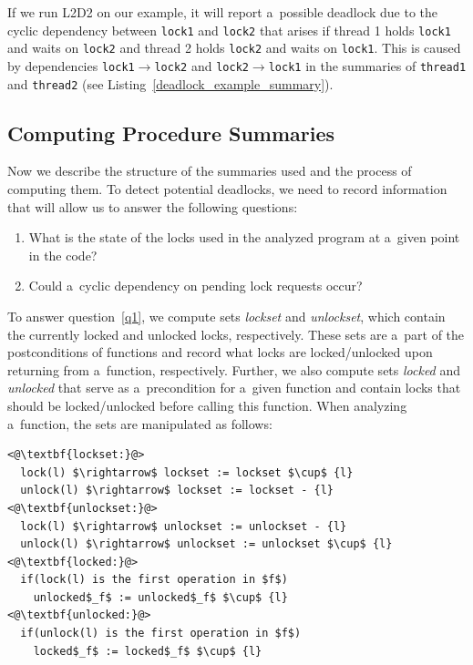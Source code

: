 \documentclass{ExcelAtFIT}
\begin{document}
If we run L2D2 on our example, it will report a~possible deadlock due to the cyclic dependency between \texttt{lock1} and \texttt{lock2} that arises if thread 1 holds \texttt{lock1} and waits on \texttt{lock2} and thread 2 holds \texttt{lock2} and waits on \texttt{lock1}. This is caused by dependencies \texttt{lock1$\rightarrow$lock2} and \texttt{lock2$\rightarrow$lock1} in the summaries of \texttt{thread1} and \texttt{thread2}
(see Listing~\ref{deadlock_example_summary}).

\subsection{Computing Procedure Summaries}
\label{summ_computation}
Now we describe the structure of the summaries used and the process of computing them. To detect potential deadlocks, we need to record information that will allow us to answer the following questions:
\begin{enumerate}[label={(\arabic*)}, topsep=0.4em]
    \item \label{q1} What is the state of the locks used in the analyzed program at a~given point in the code?
    \item \label{q2} Could a~cyclic dependency on pending lock requests occur?
\end{enumerate}

To answer question~\ref{q1}, we compute sets \textit{lockset} and \textit{unlockset}, which contain the currently locked and unlocked locks, respectively. These sets are a~part of the postconditions of functions and record what locks are locked/unlocked upon returning from a~function, respectively. Further, we also compute sets \textit{locked} and \textit{unlocked} that serve as a~precondition for a~given function and contain locks that should be locked/unlocked before calling this function.
When analyzing a~function, the sets are manipulated as follows:
\begin{lstlisting}[mathescape=true, keywordstyle=\ttfamily]
<@\textbf{lockset:}@>
  lock(l) $\rightarrow$ lockset := lockset $\cup$ {l}
  unlock(l) $\rightarrow$ lockset := lockset - {l}
<@\textbf{unlockset:}@>
  lock(l) $\rightarrow$ unlockset := unlockset - {l}
  unlock(l) $\rightarrow$ unlockset := unlockset $\cup$ {l}
<@\textbf{locked:}@>
  if(lock(l) is the first operation in $f$)
    unlocked$_f$ := unlocked$_f$ $\cup$ {l}
<@\textbf{unlocked:}@>
  if(unlock(l) is the first operation in $f$)
    locked$_f$ := locked$_f$ $\cup$ {l}
\end{lstlisting}
\end{document}

